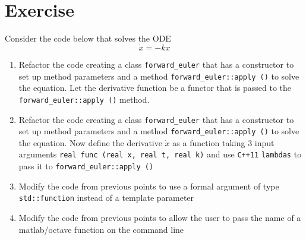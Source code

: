 \section*{Exercise}

Consider the code below that solves the ODE 
\[
\dot{x} = - k x
\]



\begin{enumerate}

\item Refactor the code creating a class 
{\tt forward\_euler} 
that has a constructor to set up method parameters and a method 
{\tt forward\_euler::apply ()} 
to solve the equation.
Let the derivative function be a functor that is passed to the 
{\tt forward\_euler::apply ()}
method.

\item Refactor the code creating a class 
{\tt forward\_euler} 
that has a constructor to set up method parameters and a method 
{\tt forward\_euler::apply ()}  
to solve the equation.
Now define the derivative $\dot x$ as a function taking 3 input arguments 
{\tt real func (real x, real t, real k)} and use {\tt C++11} {\tt lambdas} 
to pass it to {\tt forward\_euler::apply ()}

\item Modify the code from previous points to use a formal 
argument of type {\tt std::function} instead of a template parameter

\item Modify the code from previous points to allow the user 
to pass the name of a matlab/octave function on the command line

  
\end{enumerate}

